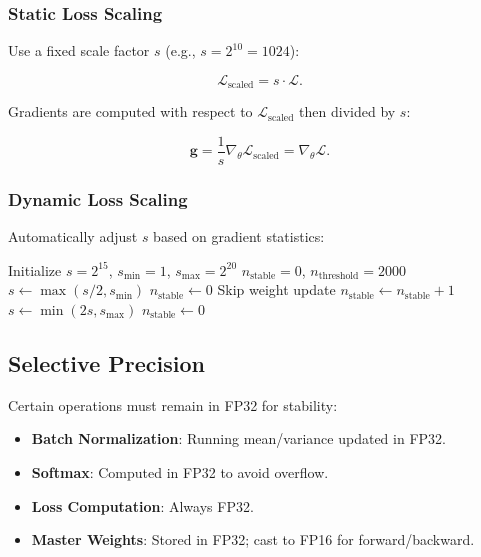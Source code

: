 \documentclass[12pt]{report}
\theoremstyle{definition}
\newcommand{\loss}{\mathcal{L}}
\begin{document}
\subsubsection{Static Loss Scaling}

Use a fixed scale factor $s$ (e.g., $s = 2^{10} = 1024$):

\begin{equation}
\loss_{\text{scaled}} = s \cdot \loss.
\label{eq:static_loss_scale}
\end{equation}

Gradients are computed with respect to $\loss_{\text{scaled}}$ then divided by $s$:

\begin{equation}
\mathbf{g} = \frac{1}{s} \nabla_\theta \loss_{\text{scaled}} = \nabla_\theta \loss.
\label{eq:unscale_gradient}
\end{equation}

\subsubsection{Dynamic Loss Scaling}

Automatically adjust $s$ based on gradient statistics:

\begin{algorithm}[H]
\caption{Dynamic Loss Scaling}
\label{alg:dynamic_loss_scale}
\begin{algorithmic}[1]
\STATE Initialize $s = 2^{15}$, $s_{\min} = 1$, $s_{\max} = 2^{20}$
\STATE $n_{\text{stable}} = 0$, $n_{\text{threshold}} = 2000$
        \STATE $s \leftarrow \max(s / 2, s_{\min})$
        \STATE $n_{\text{stable}} \leftarrow 0$
        \STATE Skip weight update
    \ELSE
        \STATE $n_{\text{stable}} \leftarrow n_{\text{stable}} + 1$
            \STATE $s \leftarrow \min(2s, s_{\max})$
            \STATE $n_{\text{stable}} \leftarrow 0$
        \ENDIF
    \ENDIF
\ENDWHILE
\end{algorithmic}
\end{algorithm}

\subsection{Selective Precision}

Certain operations must remain in FP32 for stability:

\begin{itemize}
\item \textbf{Batch Normalization}: Running mean/variance updated in FP32.
\item \textbf{Softmax}: Computed in FP32 to avoid overflow.
\item \textbf{Loss Computation}: Always FP32.
\item \textbf{Master Weights}: Stored in FP32; cast to FP16 for forward/backward.
\end{itemize}
\end{document}
